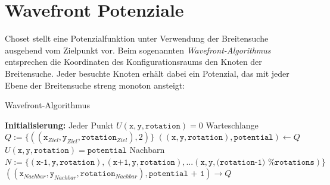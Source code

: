 \vspace*{0.2cm}
\section{Wavefront Potenziale}

Choset stellt eine Potenzialfunktion unter Verwendung der Breitensuche ausgehend vom Zielpunkt vor. Beim sogenannten \textit{Wavefront-Algorithmus} entsprechen die Koordinaten des Konfigurationsraums den Knoten der Breitensuche. Jeder besuchte Knoten erhält dabei ein Potenzial, das mit jeder Ebene der Breitensuche streng monoton ansteigt: \cite{choset.2007}
\vspace*{0.1cm}
\begin{algorithm}
\caption{Wavefront-Algorithmus}
	\begin{algorithmic}[1]
  \State \textbf{Initialisierung:}
  \State \hspace{\algorithmicindent} Jeder Punkt $U(\texttt{x}, \texttt{y}, \texttt{rotation}) = 0$
  \State \hspace{\algorithmicindent} Warteschlange $Q := \{((\texttt{x}_{Ziel}, \texttt{y}_{Ziel}, \texttt{rotation}_{Ziel}), 2)\}$
		\vspace*{0.3cm}
      \State $((\texttt{x}, \texttt{y}, \texttt{rotation}), \texttt{potential}) \gets Q$
      \State $U(\texttt{x}, \texttt{y}, \texttt{rotation}) = \texttt{potential}$
      \State Nachbarn $N := \{(\texttt{x-1}, \texttt{y}, \texttt{rotation}), (\texttt{x+1}, \texttt{y}, \texttt{rotation}), ... (\texttt{x}, \texttt{y}, \texttt{(rotation-1) \% rotations})\}$
              \State $((\texttt{x}_{Nachbar}, \texttt{y}_{Nachbar}, \texttt{rotation}_{Nachbar}), \texttt{potential + 1}) \rightarrow Q$
          \EndIf
      \EndFor
  \EndWhile
	\end{algorithmic}
\end{algorithm}

